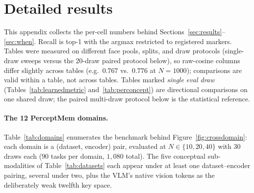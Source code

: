 \appendix

\section{Detailed results}
\label{app:tables}

This appendix collects the per-cell numbers behind Sections~\ref{sec:results}--\ref{sec:when}. Recall is top-1 with the argmax restricted to registered markers. Tables were measured on different face pools, splits, and draw protocols (single-draw sweeps versus the 20-draw paired protocol below), so raw-cosine columns differ slightly across tables (e.g.\ $0.767$ vs.\ $0.776$ at $N{=}1000$); comparisons are valid within a table, not across tables. Tables marked \emph{single eval draw} (Tables~\ref{tab:learnedmetric} and~\ref{tab:perconcept}) are directional comparisons on one shared draw; the paired multi-draw protocol below is the statistical reference.

\paragraph{The 12 PerceptMem domains.} Table~\ref{tab:domains} enumerates the benchmark behind Figure~\ref{fig:crossdomain}: each domain is a (dataset, encoder) pair, evaluated at $N\in\{10,20,40\}$ with $30$ draws each ($90$ tasks per domain, $1{,}080$ total). The five conceptual sub-modalities of Table~\ref{tab:datasets} each appear under at least one dataset--encoder pairing, several under two, plus the VLM's native vision tokens as the deliberately weak twelfth key space.

